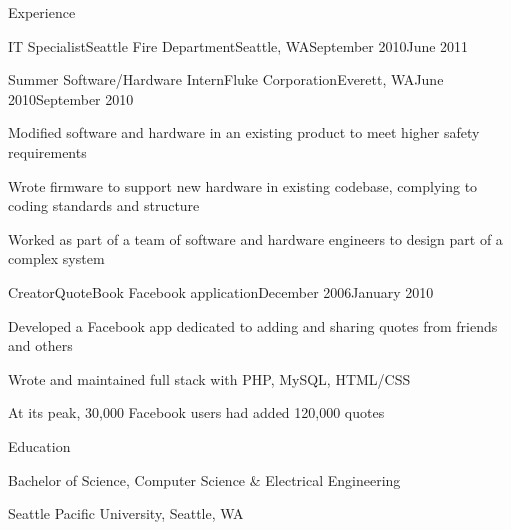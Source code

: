 \documentclass[letterpaper,10pt]{article}
\begin{document}
\begin{res_section}{Experience}
\begin{res_experienceitem}{IT Specialist}{Seattle Fire Department}{Seattle, WA}{September 2010}{June 2011}
\end{res_experienceitem}
\begin{res_experienceitem}{Summer Software/Hardware Intern}{Fluke Corporation}{Everett, WA}{June 2010}{September 2010}
  \item Modified software and hardware in an existing product to meet higher safety requirements
  \item Wrote firmware to support new hardware in existing codebase, complying to coding standards and structure
  \item Worked as part of a team of software and hardware engineers to design part of a complex system
\end{res_experienceitem}
\begin{res_experienceitem}{Creator}{QuoteBook Facebook application}{}{December 2006}{January 2010}
  \item Developed a Facebook app dedicated to adding and sharing quotes from friends and others
  \item Wrote and maintained full stack with PHP, MySQL, HTML/CSS
  \item At its peak, 30,000 Facebook users had added 120,000 quotes
\end{res_experienceitem}
\end{res_section}

\begin{res_section}{Education}
\begin{res_subsection}{Bachelor of Science, Computer Science \& Electrical Engineering}
    \item Seattle Pacific University, Seattle, WA
\end{res_subsection}
\end{res_section}
\end{document}
